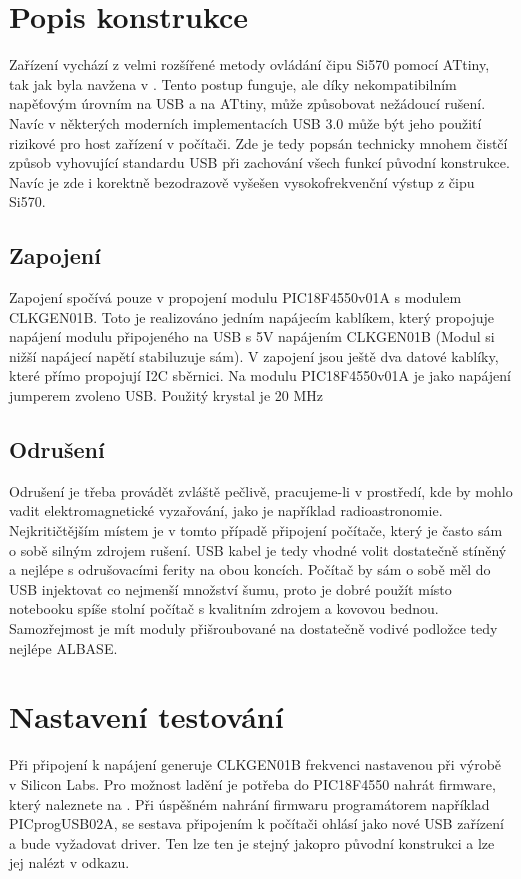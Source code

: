 \documentclass[12pt,a4paper,oneside]{article}
\begin{document}
\section{Popis konstrukce}
Zařízení vychází z velmi rozšířené metody ovládání čipu Si570 pomocí ATtiny, tak jak byla navžena v . Tento postup funguje, ale díky nekompatibilním napěťovým úrovním na USB a na ATtiny, může způsobovat nežádoucí rušení. Navíc v některých moderních implementacích USB 3.0 může být jeho použití rizikové pro host zařízení v počítači. Zde je tedy popsán technicky mnohem čistčí způsob vyhovující standardu USB při zachování všech funkcí původní konstrukce.
Navíc je zde i korektně bezodrazově vyšešen vysokofrekvenční výstup z čipu Si570. 

\subsection{Zapojení}
Zapojení spočívá pouze v propojení modulu PIC18F4550v01A s modulem CLKGEN01B. Toto je realizováno jedním napájecím kablíkem, který propojuje napájení modulu připojeného na USB s 5V napájením CLKGEN01B (Modul si nižší napájecí napětí stabiluzuje sám). V zapojení jsou ještě dva datové kablíky, které přímo propojují I2C sběrnici.
Na modulu PIC18F4550v01A je jako napájení jumperem zvoleno USB. Použitý krystal je 20 MHz

\subsection{Odrušení}

Odrušení je třeba provádět zvláště pečlivě, pracujeme-li v prostředí, kde by mohlo vadit elektromagnetické vyzařování, jako je například radioastronomie. Nejkritičtějším místem je v tomto případě připojení počítače, který je často sám o sobě silným zdrojem rušení. USB kabel je tedy vhodné volit dostatečně stíněný a nejlépe s odrušovacími ferity na obou koncích. Počítač by sám o sobě měl do USB injektovat co nejmenší množství šumu, proto je dobré použít místo notebooku spíše stolní počítač s kvalitním zdrojem a kovovou bednou. Samozřejmost je mít moduly přišroubované na dostatečně vodivé podložce tedy nejlépe ALBASE.  

\section{Nastavení testování}
Při připojení k napájení generuje CLKGEN01B frekvenci nastavenou při výrobě v Silicon Labs. Pro možnost ladění je potřeba do PIC18F4550 nahrát firmware, který naleznete na . Při úspěšném nahrání firmwaru programátorem například PICprogUSB02A, se sestava připojením k počítači ohlásí jako nové USB zařízení a bude vyžadovat driver. Ten lze ten je stejný jakopro původní konstrukci a lze jej nalézt v odkazu.
\end{document}
